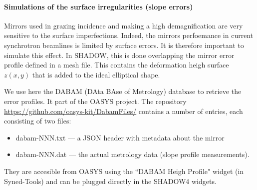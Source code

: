 \paragraph{Simulations of the surface irregularities (slope errors)}


Mirrors used in grazing incidence and making a high demagnification are very sensitive to the surface imperfections. Indeed, the mirrors perfoemance in current synchrotron beamlines is limited by surface errors. It is therefore important to simulate this effect. In SHADOW, this is done overlapping the mirror error profile defined in a mesh file. This contains the deformation heigh surface $z(x,y)$ that is added to the ideal elliptical shape. 

We use here 
the DABAM (DAta BAse of Metrology) database to retrieve the error profiles. It part of the OASYS project. The repository \url{https://github.com/oasys-kit/DabamFiles/} contains a number of entries, each consisting of two files:
\begin{itemize}
    \item dabam-NNN.txt — a JSON header with metadata about the mirror
    \item dabam-NNN.dat — the actual metrology data (slope profile measurements).
\end{itemize}

They are accesible from OASYS using the ``DABAM Heigh Profile" widget (in Syned-Tools) and can be plugged directly in the SHADOW4 widgets. 


